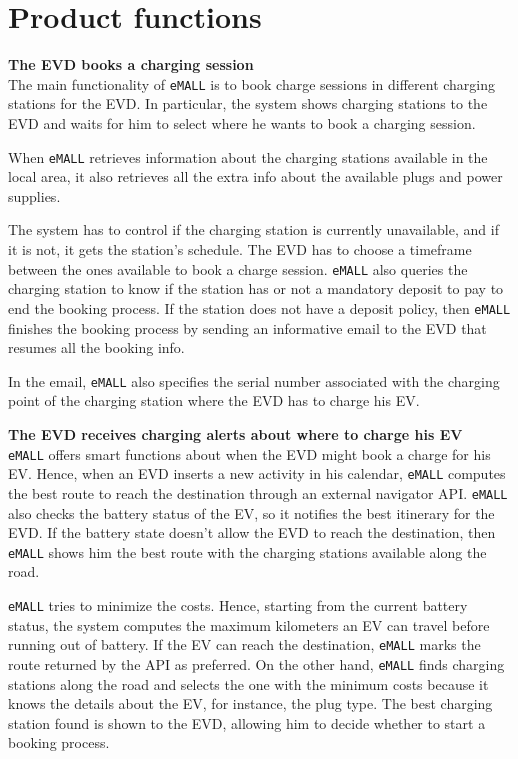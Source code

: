 \section{Product functions}
\label{sec:product_functions}%
\textbf{The EVD books a charging session} \\
The main functionality of \verb|eMALL| is to book charge sessions in different charging stations for the EVD\@.
In particular, the system shows charging stations to the EVD and waits for him to select where he wants to book a charging session.

When \verb|eMALL| retrieves information about the charging stations available in the local area, it also retrieves all the extra info about the available plugs and power supplies.

The system has to control if the charging station is currently unavailable, and if it is not, it gets the station's schedule.
The EVD has to choose a timeframe between the ones available to book a charge session.
\verb|eMALL| also queries the charging station to know if the station has or not a mandatory deposit to pay to end the booking process.
If the station does not have a deposit policy, then \verb|eMALL| finishes the booking process by sending an informative email to the EVD that resumes all the booking info.

In the email, \verb|eMALL| also specifies the serial number associated with the charging point of the charging station where the EVD has to charge his EV\@.

\textbf{The EVD receives charging alerts about where to charge his EV} \\
\verb|eMALL| offers smart functions about when the EVD might book a charge for his EV\@.
Hence, when an EVD inserts a new activity in his calendar, \verb|eMALL| computes the best route to reach the destination through an external navigator API\@.
\verb|eMALL| also checks the battery status of the EV, so it notifies the best itinerary for the EVD\@.
If the battery state doesn't allow the EVD to reach the destination, then \verb|eMALL| shows him the best route with the charging stations available along the road.

\verb|eMALL| tries to minimize the costs.
Hence, starting from the current battery status, the system computes the maximum kilometers an EV can travel before running out of battery.
If the EV can reach the destination, \verb|eMALL| marks the route returned by the API as preferred.
On the other hand, \verb|eMALL| finds charging stations along the road and selects the one with the minimum costs because it knows the details about the EV, for instance, the plug type.
The best charging station found is shown to the EVD, allowing him to decide whether to start a booking process.

